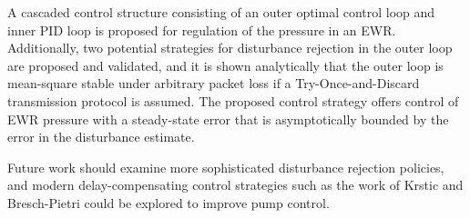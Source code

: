 A cascaded control structure consisting of an outer optimal control loop and inner PID loop is proposed for regulation of the pressure in an EWR. Additionally, two potential strategies for disturbance rejection in the outer loop are proposed and validated, and it is shown analytically that the outer loop is mean-square stable under arbitrary packet loss if a Try-Once-and-Discard transmission protocol is assumed. The proposed control strategy offers control of EWR pressure with a steady-state error that is asymptotically bounded by the error in the disturbance estimate.

Future work should examine more sophisticated disturbance rejection policies, and modern delay-compensating control strategies such as the work of Krstic and Bresch-Pietri \cite{Bresch-Pietri2010} could be explored to improve pump control.